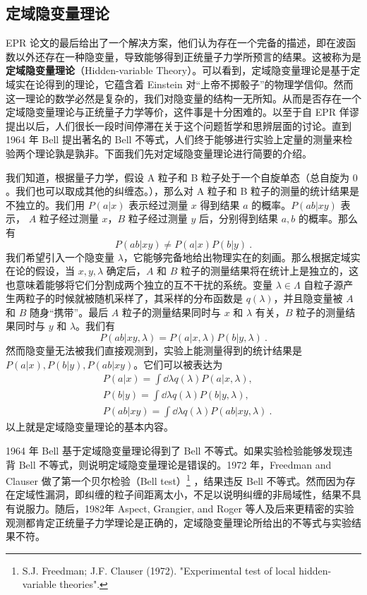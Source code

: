 \subsection{定域隐变量理论}
EPR 论文的最后给出了一个解决方案，他们认为存在一个完备的描述，即在波函数以外还存在一种隐变量，导致能够得到正统量子力学所预言的结果。这被称为是\textbf{定域隐变量理论}（Hidden-variable Theory）。可以看到，定域隐变量理论是基于定域实在论得到的理论，它蕴含着 Einstein 对“上帝不掷骰子”的物理学信仰。然而这一理论的数学必然是复杂的，我们对隐变量的结构一无所知。从而是否存在一个定域隐变量理论与正统量子力学等价，这件事是十分困难的。以至于自 EPR 佯谬提出以后，人们很长一段时间停滞在关于这个问题哲学和思辨层面的讨论。直到 1964 年 Bell 提出著名的 Bell 不等式，人们终于能够进行实验上定量的测量来检验两个理论孰是孰非。下面我们先对定域隐变量理论进行简要的介绍。

我们知道，根据量子力学，假设 A 粒子和 B 粒子处于一个自旋单态（总自旋为 $0$。我们也可以取成其他的纠缠态。），那么对 A 粒子和 B 粒子的测量的统计结果是不独立的。我们用 $P(a | x)$ 表示经过测量 $x$ 得到结果 $a$ 的概率。$P(ab | xy)$ 表示， $A$ 粒子经过测量 $x$，$B$ 粒子经过测量 $y$ 后，分别得到结果 $a,b$ 的概率。那么有
\begin{equation}
P(ab|xy)\neq P(a|x)P(b|y)~.
\end{equation}
我们希望引入一个隐变量 $\lambda$，它能够完备地给出物理实在的刻画。那么根据定域实在论的假设，当 $x,y,\lambda$ 确定后，$A$ 和 $B$ 粒子的测量结果将在统计上是独立的，这也意味着能够将它们分割成两个独立的互不干扰的系统。变量 $\lambda\in \Lambda$ 自粒子源产生两粒子的时候就被随机采样了，其采样的分布函数是 $q(\lambda)$，并且隐变量被 $A$ 和 $B$ 随身“携带”。最后 $A$ 粒子的测量结果同时与 $x$ 和 $\lambda$ 有关，$B$ 粒子的测量结果同时与 $y$ 和 $\lambda$。我们有
\begin{equation}
P(ab|xy,\lambda)=P(a|x,\lambda)P(b|y,\lambda)~.
\end{equation}
然而隐变量无法被我们直接观测到，实验上能测量得到的统计结果是 $P(a|x),P(b|y),P(ab|xy)$。它们可以被表达为
\begin{equation}
\begin{aligned}
&P(a|x)=\int \dd \lambda q(\lambda)P(a|x,\lambda),\\
&P(b|y)=\int \dd \lambda q(\lambda)P(b|y,\lambda),\\
&P(ab|xy)=\int \dd \lambda q(\lambda)P(ab|xy,\lambda)~.
\end{aligned}
\end{equation}
以上就是定域隐变量理论的基本内容。

1964 年 Bell 基于定域隐变量理论得到了 Bell 不等式。如果实验检验能够发现违背 Bell 不等式，则说明定域隐变量理论是错误的。1972 年，Freedman and Clauser 做了第一个贝尔检验（Bell test）\footnote{S.J. Freedman; J.F. Clauser (1972). "Experimental test of local hidden-variable theories".} ，结果违反 Bell 不等式。然而因为存在定域性漏洞，即纠缠的粒子间距离太小，不足以说明纠缠的非局域性，结果不具有说服力。随后，1982年 Aspect, Grangier, and Roger 等人及后来更精密的实验观测都肯定正统量子力学理论是正确的，定域隐变量理论所给出的不等式与实验结果不符。
